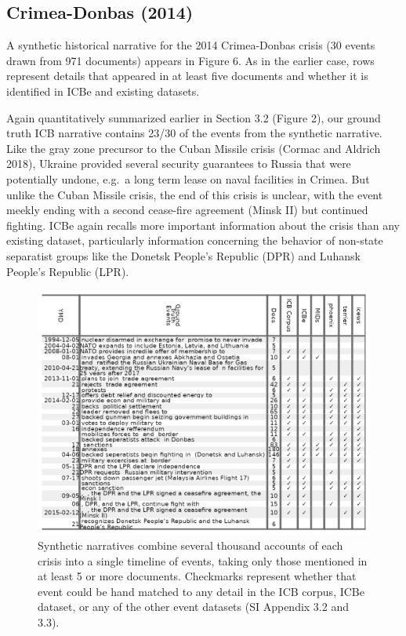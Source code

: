 \documentclass{article}
\begin{document}
\hypertarget{crimea-donbas-2014}{%
\subsection{Crimea-Donbas (2014)}\label{crimea-donbas-2014}}

A synthetic historical narrative for the 2014 Crimea-Donbas crisis (30
events drawn from 971 documents) appears in Figure 6. As in the earlier
case, rows represent details that appeared in at least five documents
and whether it is identified in ICBe and existing datasets.

Again quantitatively summarized earlier in Section 3.2 (Figure 2), our
ground truth ICB narrative contains 23/30 of the events from the
synthetic narrative. Like the gray zone precursor to the Cuban Missile
crisis (Cormac and Aldrich 2018), Ukraine provided several security
guarantees to Russia that were potentially undone, e.g.~a long term
lease on naval facilities in Crimea. But unlike the Cuban Missile
crisis, the end of this crisis is unclear, with the event meekly ending
with a second cease-fire agreement (Minsk II) but continued fighting.
ICBe again recalls more important information about the crisis than any
existing dataset, particularly information concerning the behavior of
non-state separatist groups like the Donetsk People's Republic (DPR) and
Luhansk People's Republic (LPR).

\begin{figure}
\hypertarget{fig-recall-crimea}{%
\centering
\includegraphics{case_study_crimea_recall.png}
\caption{Synthetic narratives combine several thousand accounts of each
crisis into a single timeline of events, taking only those mentioned in
at least 5 or more documents. Checkmarks represent whether that event
could be hand matched to any detail in the ICB corpus, ICBe dataset, or
any of the other event datasets (SI Appendix 3.2 and
3.3).}\label{fig-recall-crimea}
}
\end{figure}
\end{document}
